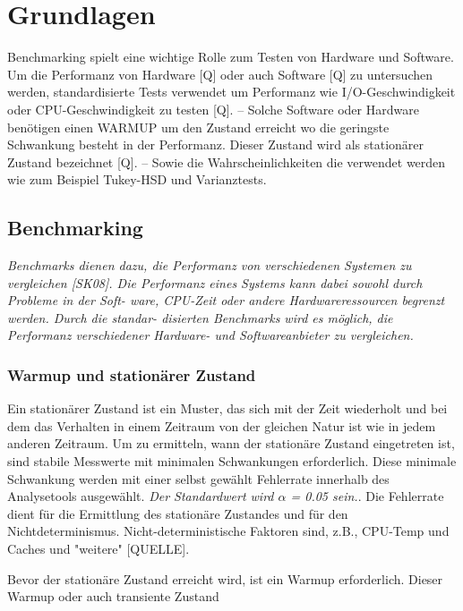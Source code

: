 \chapter{Grundlagen}
\label{cha:Grundlagen}
Benchmarking spielt eine wichtige Rolle zum Testen von Hardware und Software.
Um die Performanz von Hardware [Q] oder auch Software [Q] zu untersuchen werden, standardisierte Tests verwendet
um Performanz wie I/O-Geschwindigkeit oder CPU-Geschwindigkeit zu testen [Q].
-- Solche Software oder Hardware benötigen einen WARMUP um den Zustand erreicht wo die geringste Schwankung
besteht in der Performanz. Dieser Zustand wird als stationärer Zustand bezeichnet [Q]. --
Sowie die Wahrscheinlichkeiten die verwendet werden wie zum Beispiel Tukey-HSD und Varianztests.

\section{Benchmarking}
\textit{Benchmarks dienen dazu, die Performanz von verschiedenen Systemen zu vergleichen
[SK08]. Die Performanz eines Systems kann dabei sowohl durch Probleme in der Soft-
ware, CPU-Zeit oder andere Hardwareressourcen begrenzt werden. Durch die standar-
disierten Benchmarks wird es möglich, die Performanz verschiedener Hardware- und
Softwareanbieter zu vergleichen.}

\subsection{Warmup und stationärer Zustand}
Ein stationärer Zustand ist ein Muster, das sich mit der Zeit wiederholt und bei dem das Verhalten in einem Zeitraum von der 
gleichen Natur ist wie in jedem anderen Zeitraum. Um zu ermitteln,
wann der stationäre Zustand eingetreten ist, sind stabile Messwerte mit minimalen Schwankungen erforderlich.
Diese minimale Schwankung werden mit einer selbst gewählt Fehlerrate innerhalb des Analysetools ausgewählt.
\textit{Der Standardwert wird $\alpha$ = 0.05 sein.}. Die Fehlerrate dient für die Ermittlung des stationäre Zustandes und
für den Nichtdeterminismus. Nicht-deterministische Faktoren sind, z.B., CPU-Temp und Caches und "weitere" [QUELLE].


Bevor der stationäre Zustand erreicht wird, ist ein Warmup erforderlich.
Dieser Warmup oder auch transiente Zustand

